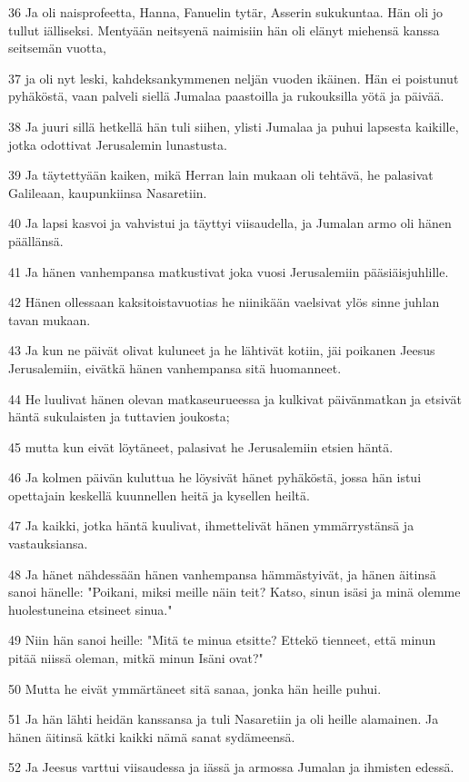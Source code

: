\par 36 Ja oli naisprofeetta, Hanna, Fanuelin tytär, Asserin sukukuntaa. Hän oli jo tullut iälliseksi. Mentyään neitsyenä naimisiin hän oli elänyt miehensä kanssa seitsemän vuotta,
\par 37 ja oli nyt leski, kahdeksankymmenen neljän vuoden ikäinen. Hän ei poistunut pyhäköstä, vaan palveli siellä Jumalaa paastoilla ja rukouksilla yötä ja päivää.
\par 38 Ja juuri sillä hetkellä hän tuli siihen, ylisti Jumalaa ja puhui lapsesta kaikille, jotka odottivat Jerusalemin lunastusta.
\par 39 Ja täytettyään kaiken, mikä Herran lain mukaan oli tehtävä, he palasivat Galileaan, kaupunkiinsa Nasaretiin.
\par 40 Ja lapsi kasvoi ja vahvistui ja täyttyi viisaudella, ja Jumalan armo oli hänen päällänsä.
\par 41 Ja hänen vanhempansa matkustivat joka vuosi Jerusalemiin pääsiäisjuhlille.
\par 42 Hänen ollessaan kaksitoistavuotias he niinikään vaelsivat ylös sinne juhlan tavan mukaan.
\par 43 Ja kun ne päivät olivat kuluneet ja he lähtivät kotiin, jäi poikanen Jeesus Jerusalemiin, eivätkä hänen vanhempansa sitä huomanneet.
\par 44 He luulivat hänen olevan matkaseurueessa ja kulkivat päivänmatkan ja etsivät häntä sukulaisten ja tuttavien joukosta;
\par 45 mutta kun eivät löytäneet, palasivat he Jerusalemiin etsien häntä.
\par 46 Ja kolmen päivän kuluttua he löysivät hänet pyhäköstä, jossa hän istui opettajain keskellä kuunnellen heitä ja kysellen heiltä.
\par 47 Ja kaikki, jotka häntä kuulivat, ihmettelivät hänen ymmärrystänsä ja vastauksiansa.
\par 48 Ja hänet nähdessään hänen vanhempansa hämmästyivät, ja hänen äitinsä sanoi hänelle: "Poikani, miksi meille näin teit? Katso, sinun isäsi ja minä olemme huolestuneina etsineet sinua."
\par 49 Niin hän sanoi heille: "Mitä te minua etsitte? Ettekö tienneet, että minun pitää niissä oleman, mitkä minun Isäni ovat?"
\par 50 Mutta he eivät ymmärtäneet sitä sanaa, jonka hän heille puhui.
\par 51 Ja hän lähti heidän kanssansa ja tuli Nasaretiin ja oli heille alamainen. Ja hänen äitinsä kätki kaikki nämä sanat sydämeensä.
\par 52 Ja Jeesus varttui viisaudessa ja iässä ja armossa Jumalan ja ihmisten edessä.

